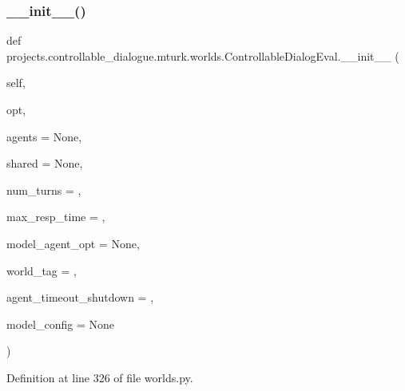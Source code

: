\subsubsection{\texorpdfstring{\+\_\+\+\_\+init\+\_\+\+\_\+()}{\_\_init\_\_()}}
{\footnotesize\ttfamily def projects.\+controllable\+\_\+dialogue.\+mturk.\+worlds.\+Controllable\+Dialog\+Eval.\+\_\+\+\_\+init\+\_\+\+\_\+ (\begin{DoxyParamCaption}\item[{}]{self,  }\item[{}]{opt,  }\item[{}]{agents = {\ttfamily None},  }\item[{}]{shared = {\ttfamily None},  }\item[{}]{num\+\_\+turns = {},  }\item[{}]{max\+\_\+resp\+\_\+time = {},  }\item[{}]{model\+\_\+agent\+\_\+opt = {\ttfamily None},  }\item[{}]{world\+\_\+tag = {\ttfamily \textquotesingle{}\textquotesingle{}},  }\item[{}]{agent\+\_\+timeout\+\_\+shutdown = {},  }\item[{}]{model\+\_\+config = {\ttfamily None} }\end{DoxyParamCaption})}



Definition at line 326 of file worlds.\+py.


